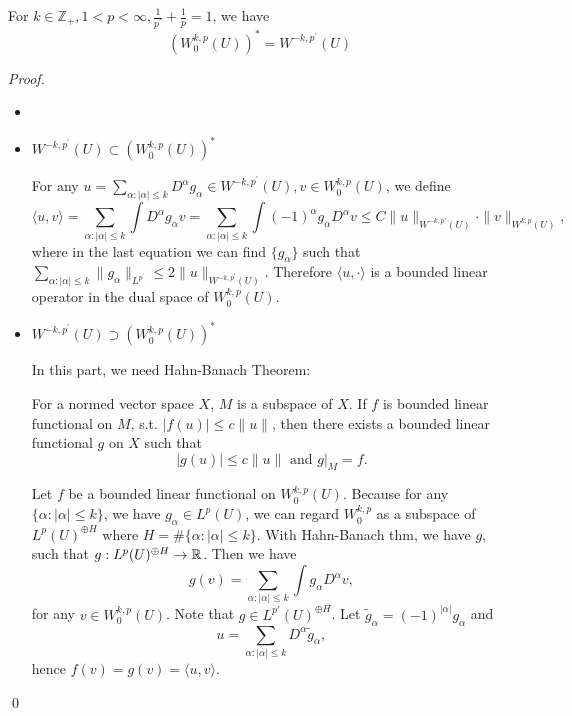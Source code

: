 \begin{theorem}
    For $k \in \mathbb{Z}_{+}, 1<p<\infty, \frac{1}{p^{\prime}}+\frac{1}{p}=1$, we have
    $$
    \left(W_{0}^{k, p}(U)\right)^{*}=W^{-k, p^{\prime}}(U)
    $$

\end{theorem}
\begin{proof}
\begin{itemize}
    \item []
    \item $W^{-k, p^{\prime}}(U) \subset \left(W_{0}^{k, p}(U)\right)^{*}$

    For any $u=\sum_{\alpha:|\alpha| \leq k} D^{\alpha} g_{\alpha}\in W^{-k, p^{\prime}}(U), v\in W_{0}^{k, p}(U)$, we define 
    \[
        \langle u,v \rangle  = \sum_{\alpha:|\alpha| \leq k}\int D^{\alpha} g_{\alpha} v = \sum_{\alpha:|\alpha| \leq k}\int (-1)^\alpha g_{\alpha} D^{\alpha}  v  \le C\|u\|_{W^{-k,p'}(U)} \cdot \|v\|_{W^{k,p}(U)},
    \]
    where in the last equation we can find $\{g_\alpha\}$ such that $\sum_{\alpha: |\alpha|\le k}\|g_\alpha\|_{L^{p^\prime }} \le 2 \|u\|_{W^{-k,p^\prime }(U)}$. Therefore $\langle u,\cdot \rangle $ is a bounded linear operator in the dual space of $W_0^{k,p}(U)$. 
    
    \item $W^{-k, p^{\prime}}(U) \supset \left(W_{0}^{k, p}(U)\right)^{*}$
    
    In this part, we need Hahn-Banach Theorem: 
    \begin{theorem}
    For a normed vector space $X$, $M$ is a subspace of $X$. If $f$ is bounded linear functional on $M$, s.t. $|f(u) \mid \le c\|u\|$, then there exists a bounded linear functional $g$ on $X$ such that 
    \[
        |g(u)| \le c\|u \| \text{ and } g|_M = f.
    \]
    \end{theorem}
    \vspace{1em}
    Let $f$ be a bounded linear functional on $W_0^{k,p}(U)$. Because for any $\{\alpha: |\alpha| \le k\}$, we have $g_\alpha \in L^p(U)$, we can regard $W_0^{k,p}$ as a subspace of $L^p(U)^{\oplus H}$ where $H = \#\{\alpha: |\alpha| \le k\}$. With Hahn-Banach thm, we have $g$, such that $g:L^p(U)^{\oplus H} \to \mathbb{R} $. Then we have 
    \[
        g(v) = \sum_{\alpha:|\alpha| \leq k}\int  g_{\alpha} D^{\alpha}  v,
    \]
    for any $v\in W_0^{k,p}(U)$. Note that $g\in L^{p'}(U)^{\oplus H}$. Let $\tilde g_\alpha = (-1)^{|\alpha|} g_\alpha$ and 
    \[
        u = \sum_{\alpha:|\alpha| \leq k} D^{\alpha} \tilde g_{\alpha},
    \]
    hence $f(v) = g(v) = \langle u,v \rangle$. 

\end{itemize}
\qed
\end{proof}

